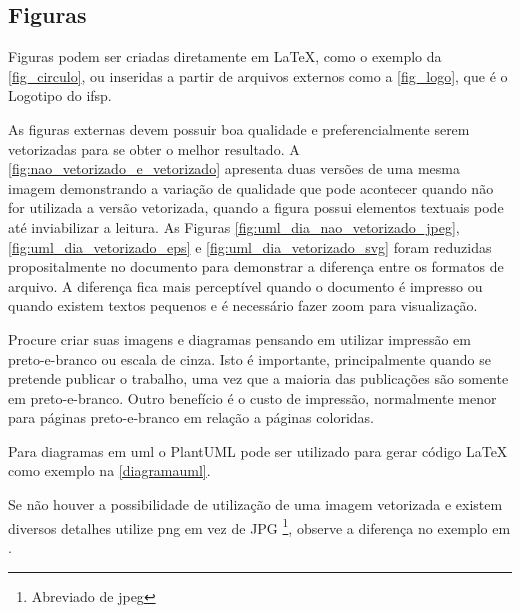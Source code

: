 \subsection{Figuras}
\label{sec_figuras}

Figuras podem ser criadas diretamente em \LaTeX,
como o exemplo da \autoref{fig_circulo}, ou inseridas a partir de arquivos externos como a \autoref{fig_logo}, que é o Logotipo do \ac{ifsp}. 

As figuras externas devem possuir boa qualidade e preferencialmente serem vetorizadas para se obter o melhor resultado. A \autoref{fig:nao_vetorizado_e_vetorizado} apresenta duas versões de uma mesma imagem demonstrando a variação de qualidade que pode acontecer quando não for utilizada a versão vetorizada, quando a figura possui elementos textuais pode até inviabilizar a leitura. As Figuras \ref{fig:uml_dia_nao_vetorizado_jpeg}, \ref{fig:uml_dia_vetorizado_eps} e \ref{fig:uml_dia_vetorizado_svg} foram reduzidas propositalmente no documento para demonstrar a diferença entre os formatos de arquivo. A diferença fica mais perceptível quando o documento é impresso ou quando existem textos pequenos e é necessário fazer zoom para visualização.

Procure criar suas imagens e diagramas pensando em utilizar impressão em preto-e-branco ou escala de cinza. Isto é importante, principalmente quando se pretende publicar o trabalho, uma vez que a maioria das publicações são somente em preto-e-branco. Outro benefício é o custo de impressão, normalmente menor para páginas preto-e-branco em relação a páginas coloridas.

Para diagramas em \ac{uml} o PlantUML pode ser utilizado para gerar código {\LaTeX} como exemplo na  \autoref{diagramauml}.


Se não houver a possibilidade de utilização de uma imagem vetorizada e existem diversos detalhes utilize \ac{png} em vez de JPG \footnote{Abreviado de \ac{jpeg}}, observe a diferença no exemplo em .


